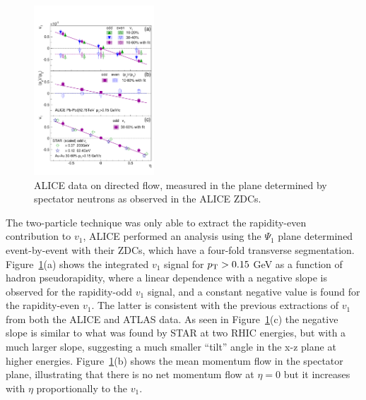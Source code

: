 \begin{figure}[!tb]
\begin{center}
\includegraphics[width=0.4\textwidth]{flowcorrelations_figs/paper_v1_midrapidity_spectators_Figure2.pdf}
\caption[]{ALICE data on directed flow, measured in the plane determined by spectator neutrons
as observed in the ALICE ZDCs.}
\label{fig:pas:fc:v1b}
\end{center}
\end{figure}

The two-particle technique was only able to extract the rapidity-even contribution to $v_1$,
ALICE performed an analysis using the $\Psi_1$ plane determined event-by-event with their
ZDCs, which have a four-fold transverse segmentation.
Figure~\ref{fig:pas:fc:v1b}(a) shows the integrated $v_1$ signal for $\mbox{$p_{\mathrm{T}}$}>0.15$ GeV as a
function of hadron pseudorapidity, where a linear dependence with a negative slope is observed
for the rapidity-odd $v_1$ signal, and a constant negative value is found for the rapidity-even
$v_1$.  The latter is consistent with the previous extractions of $v_1$ from both the ALICE
and ATLAS data.
As seen in Figure~\ref{fig:pas:fc:v1b}(c) the negative slope is similar to what was found by STAR at
two RHIC energies, but with a much larger slope, suggesting a much smaller ``tilt'' angle
in the x-z plane at higher energies.
Figure~\ref{fig:pas:fc:v1b}(b) shows the mean momentum flow in the spectator plane, illustrating 
that there is no net momentum flow at $\eta=0$ but it increases with $\eta$ proportionally 
to the $v_1$.  

